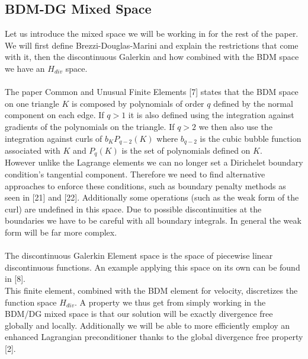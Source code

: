\documentclass[11pt,twoside,a4paper]{article}
\begin{document}
\subsection{BDM-DG Mixed Space}
Let us introduce the mixed space we will be working in for the rest of the paper. We will first define Brezzi-Douglas-Marini and explain the restrictions that come with it, then the discontinuous Galerkin and how combined with the BDM space we have an $H_{div}$ space.\\
\\
The paper Common and Unusual Finite Elements [7] states that the BDM space on one triangle $K$ is composed by polynomials of order $q$ defined by the normal component on each edge. If $q > 1$ it is also defined using the integration against gradients of the polynomials on the triangle. If $q > 2$ we then also use the integration  against curls of $b_K P_{q-2}(K)$ where $b_{q-2}$ is the cubic bubble function associated with $K$ and $P_{q}(K)$ is the set of polynomials defined on $K$.\\

However unlike the Lagrange elements we can no longer set a Dirichelet boundary condition's tangential component. Therefore we need to find alternative approaches to enforce these conditions, such as boundary penalty methods as seen in [21] and [22].
Additionally some operations (such as the weak form of the curl) are undefined in this space. Due to possible discontinuities at the boundaries we have to be careful with all boundary integrals.
In general the weak form will be far more complex.\\
\\

The discontinuous Galerkin Element space is the space of piecewise linear discontinuous functions. An example applying this space on its own can be found in [8].\\
This finite element, combined with the BDM element for velocity, discretizes the function space $H_{div}$. A property we thus get from simply working in the BDM/DG mixed space is that our solution will be exactly divergence free globally and locally.
Additionally we will be able to more efficiently employ an enhanced Lagrangian preconditioner thanks to the global divergence free property [2].\\
\end{document}
